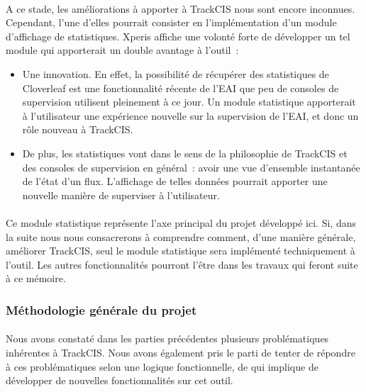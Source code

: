 			\paragraph{}%
			A ce stade, les améliorations à apporter à TrackCIS nous sont encore
			inconnues. Cependant, l'une d'elles pourrait consister en l'implémentation
			d'un module d'affichage de statistiques. Xperis affiche une volonté forte de
			développer un tel module qui apporterait un double avantage à l'outil~:
			\begin{itemize}
			  \item Une innovation. En effet, la possibilité de récupérer des
			  statistiques de Cloverleaf est une fonctionnalité récente de l'EAI que peu
			  de consoles de supervision utilisent pleinement à ce jour. Un module
			  statistique apporterait à l'utilisateur une expérience nouvelle sur la
			  supervision de l'EAI, et donc un rôle nouveau à TrackCIS.
			  \item De plus, les statistiques vont dans le sens de la philosophie de
			  TrackCIS et des consoles de supervision en général~: avoir une vue
			  d'ensemble instantanée de l'état d'un flux. L'affichage de telles données
			  pourrait apporter une nouvelle manière de superviser à l'utilisateur.
			\end{itemize}
			
			\paragraph{}
			Ce module statistique représente l'axe principal du projet développé ici. Si,
			dans la suite nous nous consacrerons à comprendre comment, d'une manière
			générale, améliorer TrackCIS, seul le module statistique sera implémenté
			techniquement à l'outil. Les autres fonctionnalités pourront l'être dans les
			travaux qui feront suite à ce mémoire.
			
		\subsubsection{Méthodologie générale du projet}
			\paragraph{}%
			Nous avons constaté dans les parties précédentes plusieurs problématiques
			inhérentes à TrackCIS. Nous avons également pris le parti de tenter de
			répondre à ces problématiques selon une logique fonctionnelle, de qui
			implique de développer de nouvelles fonctionnalités sur cet outil.
			
